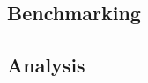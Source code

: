 \documentclass{labReport}
\begin{document}
\subsection{Benchmarking}

\subsection{Analysis}


\end{document}
